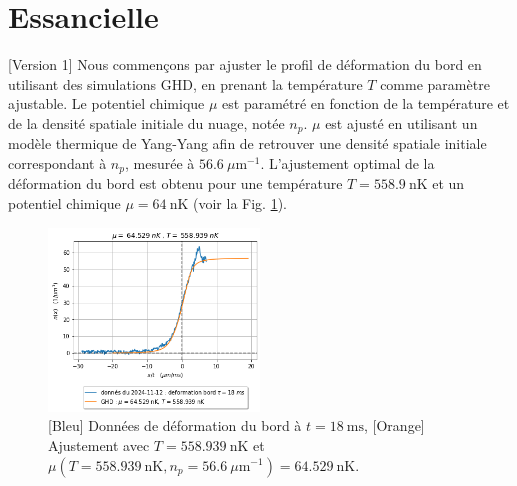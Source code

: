 \documentclass[a3, 10pt,twoside]{article}          %
\theoremstyle{plain}
\theoremstyle{definition}
\theoremstyle{remark}
\theoremstyle{definition} %
\begin{document}
	\section{Essancielle}
	
	
	[Version 1]
	Nous commençons par ajuster le profil de déformation du bord en utilisant des simulations GHD, en prenant la température $T$ comme paramètre ajustable. Le potentiel chimique $\mu$ est paramétré en fonction de la température et de la densité spatiale initiale du nuage, notée $n_p$.  $\mu$  est ajusté en utilisant un modèle thermique de Yang-Yang afin de retrouver une densité spatiale initiale correspondant à $n_p$, mesurée à $56.6 ~\mu \text{m}^{-1}$. L'ajustement optimal de la déformation du bord est obtenu pour une température $T = 558.9~\text{nK}$ et un potentiel chimique $\mu = 64~\text{nK}$ (voir la Fig. \ref{fig:simul_deformation}).


	
	\begin{figure}[ht]
    \centering
    \includegraphics[width=0.5\textwidth]{Figures/simul_deformation}
    \caption{{\color{blue} [Bleu] Données de déformation du bord à $t = 18~\text{ms}$}, {\color{orange}[Orange] Ajustement avec $T = 558.939~\text{nK}$ et $\mu(T = 558.939~\text{nK}, n_p = 56.6~\mu \text{m}^{-1}) = 64.529~\text{nK}$}.}
    \label{fig:simul_deformation}
	\end{figure}
\end{document}
